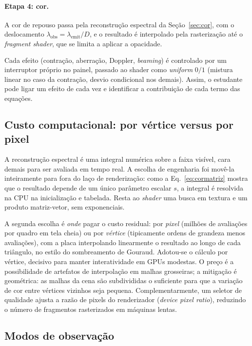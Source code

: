 \documentclass[10pt,a4paper,twocolumn]{article}
\begin{document}
\paragraph{Etapa 4: cor.} A cor de repouso passa pela reconstrução espectral da
Seção~\ref{sec:cor}, com o deslocamento $\lambda_{\mathrm{obs}} =
\lambda_{\mathrm{emit}}/D$, e o resultado é interpolado pela rasterização até o
\emph{fragment shader}, que se limita a aplicar a opacidade.

Cada efeito (contração, aberração, Doppler, \emph{beaming}) é controlado por um
interruptor próprio no painel, passado ao shader como \emph{uniform} $0/1$ (mistura linear
no caso da contração, desvio condicional nos demais). Assim, o estudante pode ligar um
efeito de cada vez e identificar a contribuição de cada termo das equações.

\subsection{Custo computacional: por vértice versus por pixel}

A reconstrução espectral é uma integral numérica sobre a faixa visível, cara demais para
ser avaliada em tempo real. A escolha de engenharia foi movê-la inteiramente para fora do
laço de renderização: como a Eq.~\eqref{eq:cormatriz} mostra que o resultado depende de um
único parâmetro escalar $s$, a integral é resolvida na CPU na inicialização e tabelada.
Resta ao \emph{shader} uma busca em textura e um produto matriz-vetor, sem exponenciais.

A segunda escolha é \emph{onde} pagar o custo residual: por \emph{pixel} (milhões de
avaliações por quadro em tela cheia) ou por \emph{vértice} (tipicamente ordens de grandeza
menos avaliações), com a placa
interpolando linearmente o resultado ao longo de cada triângulo, no estilo do sombreamento
de Gouraud. Adotou-se o cálculo por vértice, decisivo para manter interatividade em GPUs
modestas. O preço é a possibilidade de artefatos de interpolação em malhas grosseiras;
a mitigação é geométrica: as malhas da cena são subdivididas o suficiente para que a
variação de cor entre vértices vizinhos seja pequena. Complementarmente, um seletor de
qualidade ajusta a razão de pixels do renderizador (\emph{device pixel ratio}), reduzindo o
número de fragmentos rasterizados em máquinas lentas.

\subsection{Modos de observação}
\end{document}
